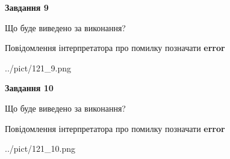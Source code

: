 \documentclass[12pt, ukrainian]{article}
\begin{document}
{{\begin {center}\textbf{Завдання 9}\end {center}}\par
Що буде виведено за виконання? \par
Повідомлення інтерпретатора про помилку позначати \textbf{error}

\begin{center}
	{../pict/121_9.png}
\end{center}
\newpage

{\begin {center}\textbf{Завдання 10}\end {center}}\par
Що буде виведено за виконання? \par
Повідомлення інтерпретатора про помилку позначати \textbf{error}

\begin{center}
	{../pict/121_10.png}
\end{center}
\newpage

}
\end{document}
